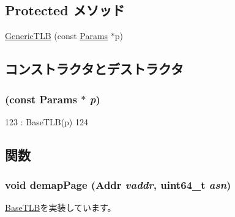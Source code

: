 \subsection*{Protected メソッド}
\begin{DoxyCompactItemize}
\item 
\hyperlink{classGenericTLB_a61583d8f1742d332e01bcf4dc01836d9}{GenericTLB} (const \hyperlink{classSimObject_a0f0761d2db586a23bb2a2880b8f387bb}{Params} $\ast$p)
\end{DoxyCompactItemize}


\subsection{コンストラクタとデストラクタ}
\hypertarget{classGenericTLB_a61583d8f1742d332e01bcf4dc01836d9}{
\subsubsection[{GenericTLB}]{ (const {\bf Params} $\ast$ {\em p})}}
\label{classGenericTLB_a61583d8f1742d332e01bcf4dc01836d9}



\begin{DoxyCode}
123         : BaseTLB(p)
124     {}
\end{DoxyCode}


\subsection{関数}
\hypertarget{classGenericTLB_a2d698ff909513b48a1263f8a5440e067}{
\subsubsection[{demapPage}]{\setlength{\rightskip}{0pt plus 5cm}void demapPage ({\bf Addr} {\em vaddr}, \/  uint64\_\-t {\em asn})}}
\label{classGenericTLB_a2d698ff909513b48a1263f8a5440e067}


\hyperlink{classBaseTLB_aff4b9d01b9a4712c699cfb2dd9b3b8cd}{BaseTLB}を実装しています。


